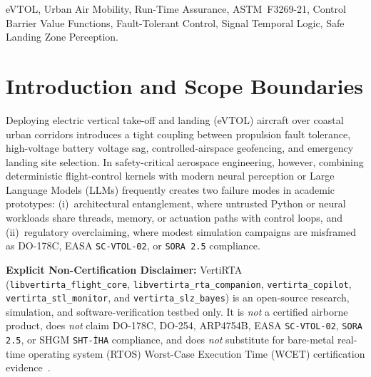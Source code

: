 \documentclass[conference,10pt]{IEEEtran}
\begin{document}
\begin{IEEEkeywords}
eVTOL, Urban Air Mobility, Run-Time Assurance, ASTM~F3269-21, Control Barrier Value Functions, Fault-Tolerant Control, Signal Temporal Logic, Safe Landing Zone Perception.
\end{IEEEkeywords}

\section{Introduction and Scope Boundaries}
\label{sec:intro}

Deploying electric vertical take-off and landing (eVTOL) aircraft over coastal urban corridors introduces a tight coupling between propulsion fault tolerance, high-voltage battery voltage sag, controlled-airspace geofencing, and emergency landing site selection. In safety-critical aerospace engineering, however, combining deterministic flight-control kernels with modern neural perception or Large Language Models (LLMs) frequently creates two failure modes in academic prototypes: (i)~architectural entanglement, where untrusted Python or neural workloads share threads, memory, or actuation paths with control loops, and (ii)~regulatory overclaiming, where modest simulation campaigns are misframed as DO-178C, EASA \texttt{SC-VTOL-02}, or \texttt{SORA 2.5} compliance.

\textbf{Explicit Non-Certification Disclaimer:} VertiRTA (\texttt{libvertirta\_flight\_core}, \texttt{libvertirta\_rta\_companion}, \texttt{vertirta\_copilot}, \texttt{vertirta\_stl\_monitor}, and \texttt{vertirta\_slz\_bayes}) is an open-source research, simulation, and software-verification testbed only. It is \emph{not} a certified airborne product, does \emph{not} claim DO-178C, DO-254, ARP4754B, EASA \texttt{SC-VTOL-02}, \texttt{SORA 2.5}, or SHGM \texttt{SHT-\.IHA} compliance, and does \emph{not} substitute for bare-metal real-time operating system (RTOS) Worst-Case Execution Time (WCET) certification evidence~\cite{easa_scvtol_2024,easa_sora25_2026,shgm_sht_iha_2026}.
\end{document}
